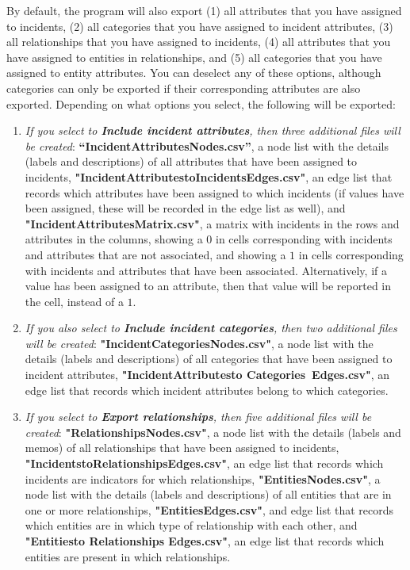 \documentclass{memoir}
\begin{document}
By default, the program will also export (1) all attributes that you have assigned to incidents, (2) all categories that you have assigned to incident attributes, (3) all relationships that you have assigned to incidents, (4) all attributes that you have assigned to entities in relationships, and (5) all categories that you have assigned to entity attributes. You can deselect any of these options, although categories can only be exported if their corresponding attributes are also exported. Depending on what options you select, the following will be exported:
\begin{enumerate}
\item{\emph{If you select to \textbf{Include incident attributes}, then three additional files will be created}: \textbf{``Incident\textunderscore Attributes\textunderscore Nodes.csv''}, a node list with the details (labels and descriptions) of all attributes that have been assigned to incidents, \textbf{"Incident\textunderscore Attributes\textunderscore to\textunderscore Incidents\textunderscore Edges.csv"}, an edge list that records which attributes have been assigned to which incidents (if values have been assigned, these will be recorded in the edge list as well), and \textbf{"Incident\textunderscore Attributes\textunderscore Matrix.csv"}, a matrix with incidents in the rows and attributes in the columns, showing a \(0\) in cells corresponding with incidents and attributes that are not associated, and showing a \(1\) in cells corresponding with incidents and attributes that have been associated. Alternatively, if a value has been assigned to an attribute, then that value will be reported in the cell, instead of a \(1\).}
\item{\emph{If you also select to \textbf{Include incident categories}, then two additional files will be created}: \textbf{"Incident\textunderscore Categories\textunderscore Nodes.csv"}, a node list with the details (labels and descriptions) of all categories that have been assigned to incident attributes, \textbf{"Incident\textunderscore Attributes\textunderscore to \textunderscore Categories\textunderscore \ Edges.csv"}, an edge list that records which incident attributes belong to which categories.}
\item{\emph{If you select to \textbf{Export relationships}, then five additional files will be created}: \textbf{"Relationships\textunderscore Nodes.csv"}, a node list with the details (labels and memos) of all relationships that have been assigned to incidents, \textbf{"Incidents\textunderscore to\textunderscore Relationships\textunderscore Edges.csv"}, an edge list that records which incidents are indicators for which relationships, \textbf{"Entities\textunderscore Nodes.csv"}, a node list with the details (labels and descriptions) of all entities that are in one or more relationships, \textbf{"Entities\textunderscore Edges.csv"}, and edge list that records which entities are in which type of relationship with each other, and \textbf{"Entities\textunderscore to \textunderscore Relationships \textunderscore Edges.csv"}, an edge list that records which entities are present in which relationships.}

\end{enumerate}
\end{document}
